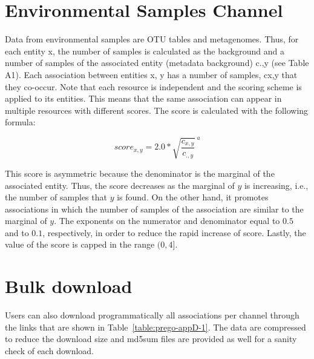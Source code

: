 \section*{Environmental Samples Channel}

Data from environmental samples are OTU tables and metagenomes. Thus, for each entity x, the number of samples is calculated as the background and a number of samples of the associated entity (metadata background) c.,y (see Table A1). Each association between entities x, y has a number of samples, cx,y that they co-occur. Note that each resource is independent and the scoring scheme is applied to its entities. This means that the same association can appear in multiple resources with different scores. The score is calculated with the following formula:

\begin{equation}
   score_{x,y} = 2.0*\sqrt{\frac{c_{x,y}}{c_{.,y}}}^{ \:a}
\end{equation}


This score is asymmetric because the denominator is the marginal of the associated entity. 
Thus, the score decreases as the marginal of $y$ is increasing, i.e., the number of samples that $y$ is found. 
On the other hand, it promotes associations in which the number of samples of the association are similar to the marginal of $y$. 
The exponents on the numerator and denominator equal to $0.5$ and 
to $0.1$, respectively, in order to reduce the rapid increase of score.
Lastly, the value of the score is capped in the range $(0,4]$.


\section{Bulk download}
\label{app:D}

Users can also download programmatically all associations per channel through the links that are shown in Table~\ref{table:prego-appD-1}. 
The data are compressed to reduce the download size and md5sum files are provided as well for a sanity check of each download.

